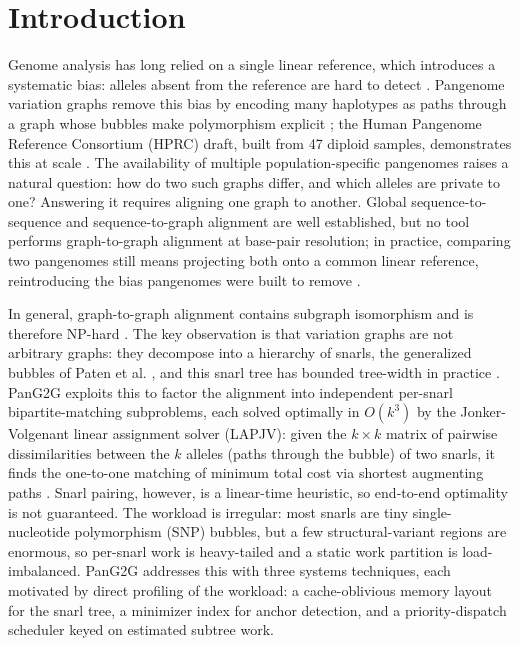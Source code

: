 \section{Introduction}
Genome analysis has long relied on a single linear reference, which introduces a systematic bias: alleles absent from the reference are hard to detect \cite{Cui2025}. Pangenome variation graphs remove this bias by encoding many haplotypes as paths through a graph whose bubbles make polymorphism explicit \cite{Garrison2024}; the Human Pangenome Reference Consortium (HPRC) draft, built from 47 diploid samples, demonstrates this at scale \cite{Liao2023-short}. The availability of multiple population-specific pangenomes raises a natural question: how do two such graphs differ, and which alleles are private to one? Answering it requires aligning one graph to another. Global sequence-to-sequence \cite{NEEDLEMAN1970443} and sequence-to-graph alignment \cite{Cui2025} are well established, but no tool performs graph-to-graph alignment at base-pair resolution; in practice, comparing two pangenomes still means projecting both onto a common linear reference, reintroducing the bias pangenomes were built to remove \cite{eizenga2020pangenome, Liao2023-short}.

In general, graph-to-graph alignment contains subgraph isomorphism and is therefore NP-hard \cite{GUPTA1996287}. The key observation is that variation graphs are not arbitrary graphs: they decompose into a hierarchy of snarls, the generalized bubbles of Paten et al. \cite{paten2018superbubbles}, and this snarl tree has bounded tree-width in practice \cite{bounded-tree-width}. PanG2G exploits this to factor the alignment into independent per-snarl bipartite-matching subproblems, each solved optimally in $O(k^3)$ by the Jonker-Volgenant linear assignment solver (LAPJV): given the $k\times k$ matrix of pairwise dissimilarities between the $k$ alleles (paths through the bubble) of two snarls, it finds the one-to-one matching of minimum total cost via shortest augmenting paths \cite{jonker1987shortest}. Snarl pairing, however, is a linear-time heuristic, so end-to-end optimality is not guaranteed. The workload is irregular: most snarls are tiny single-nucleotide polymorphism (SNP) bubbles, but a few structural-variant regions are enormous, so per-snarl work is heavy-tailed and a static work partition is load-imbalanced. PanG2G addresses this with three systems techniques, each motivated by direct profiling of the workload: a cache-oblivious memory layout for the snarl tree, a minimizer index for anchor detection, and a priority-dispatch scheduler keyed on estimated subtree work.

